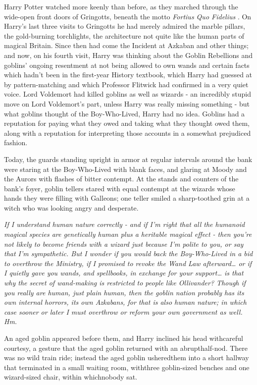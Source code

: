 Harry Potter watched more keenly than before, as they marched through the wide-open front doors of Gringotts, beneath the motto \emph{Fortius Quo Fidelius} . On Harry's last three visits to Gringotts he had merely admired the marble pillars, the gold-burning torchlights, the architecture not quite like the human parts of magical Britain. Since then had come the Incident at Azkaban and other things; and now, on his fourth visit, Harry was thinking about the Goblin Rebellions and goblins' ongoing resentment at not being allowed to own wands and certain facts which hadn't been in the first-year History textbook, which Harry had guessed at by pattern-matching and which Professor Flitwick had confirmed in a very quiet voice. Lord Voldemort had killed goblins as well as wizards - an incredibly stupid move on Lord Voldemort's part, unless Harry was really missing something - but what goblins thought of the Boy-Who-Lived, Harry had no idea. Goblins had a reputation for paying what they owed and taking what they thought owed them, along with a reputation for interpreting those accounts in a somewhat prejudiced fashion.

Today, the guards standing upright in armor at regular intervals around the bank were staring at the Boy-Who-Lived with blank faces, and glaring at Moody and the Aurors with flashes of bitter contempt. At the stands and counters of the bank's foyer, goblin tellers stared with equal contempt at the wizards whose hands they were filling with Galleons; one teller smiled a sharp-toothed grin at a witch who was looking angry and desperate.

\emph{If I understand human nature correctly - and if I'm right that all the humanoid magical species are genetically human plus a heritable magical effect - then you're not likely to become friends with a wizard just because I'm polite to you, or say that I'm sympathetic. But I wonder if you would back the Boy-Who-Lived in a bid to overthrow the Ministry, if I promised to revoke the Wand Law afterward\ldots{} or if I quietly gave you wands, and spellbooks, in exchange for your support\ldots{} is that why the secret of wand-making is restricted to people like Ollivander? Though if you really are human, just plain human, then the goblin nation probably has its own internal horrors, its own Azkabans, for that is also human nature; in which case sooner or later I must overthrow or reform your own government as well. Hm.}

An aged goblin appeared before them, and Harry inclined his head withcareful courtesy, a gesture that the aged goblin returned with an abrupthalf-nod. There was no wild train ride; instead the aged goblin usheredthem into a short hallway that terminated in a small waiting room, withthree goblin-sized benches and one wizard-sized chair, within whichnobody sat.

